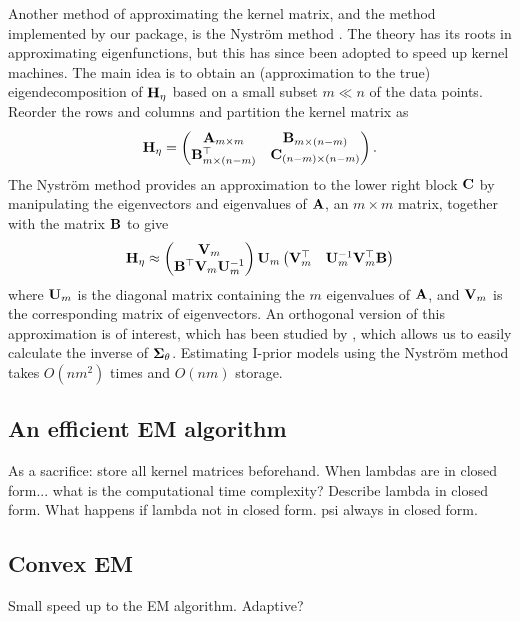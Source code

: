 Another method of approximating the kernel matrix, and the method implemented by our package, is the Nystr\"om method \citep{williams2001using}.
The theory has its roots in approximating eigenfunctions, but this has since been adopted to speed up kernel machines.
The main idea is to obtain an (approximation to the true) eigendecomposition of ${\mathbf H}_\eta$ based on a small subset $m \ll n$ of the data points.
Reorder the rows and columns and partition the kernel matrix as
%
\[
  {\mathbf H}_\eta =
  \begin{pmatrix}
    {\mathbf A}_{m\times m}         & {\mathbf B}_{m \times (n-m)} \\
    {\mathbf B}_{m \times (n-m)}^\top  & {\mathbf C}_{(n-m) \times (n-m)} \\
  \end{pmatrix}.
\]
%
The Nystr\"om method provides an approximation to the lower right block ${\mathbf C}$ by manipulating the eigenvectors and eigenvalues of ${\mathbf A}$, an $m \times m$ matrix, together with the matrix ${\mathbf B}$ to give
%
\[
  {\mathbf H}_\eta \approx
  \begin{pmatrix}
    {\mathbf V}_m \\
    {\mathbf B}^\top{\mathbf V}_m{\mathbf U}_m^{-1}
  \end{pmatrix}
  {\mathbf U}_m
  \begin{pmatrix}
    {\mathbf V}_m^\top & {\mathbf U}_m^{-1}{\mathbf V}_m^\top{\mathbf B}
  \end{pmatrix}
\]
%
where ${\mathbf U}_m$ is the diagonal matrix containing the $m$ eigenvalues of ${\mathbf A}$, and ${\mathbf V}_m$ is the corresponding matrix of eigenvectors.
An orthogonal version of this approximation is of interest, which has been studied by \cite{fowlkes2001efficient}, which allows us to easily calculate the inverse of ${\bm\Sigma}_\theta$.
Estimating I-prior models using the Nystr\"om method takes $O(nm^2)$ times and $O(nm)$ storage.

\subsection{An efficient EM algorithm}

As a sacrifice: store all kernel matrices beforehand.
When lambdas are in closed form... what is the computational time complexity?
Describe lambda in closed form.
What happens if lambda not in closed form.
psi always in closed form.

\subsection{Convex EM}

Small speed up to the EM algorithm.
Adaptive?
